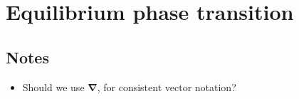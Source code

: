 \documentclass[10pt, a4paper, oneside]{book}
\begin{document}
    \chapter{Equilibrium phase transition}
    

    
    

    
    \setcounter{tocdepth}{1}
    \listoftodos
    
    \section*{Notes}
    \begin{itemize}
        \item Should we use $\bm \nabla$, for consistent vector notation?
    \end{itemize}
\end{document}
